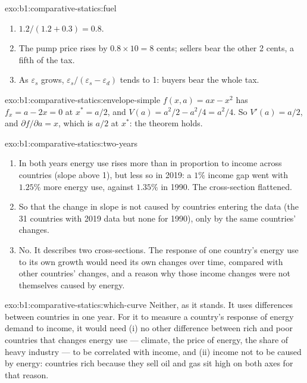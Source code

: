 \begin{solution}{exo:b1:comparative-statics:fuel}
\begin{enumerate}
  \item $1.2/(1.2 + 0.3) = 0.8$.
  \item The pump price rises by $0.8 \times 10 = 8$ cents; sellers bear the
    other 2 cents, a fifth of the tax.
  \item As $\varepsilon_s$ grows, $\varepsilon_s/(\varepsilon_s - \varepsilon_d)$ tends
    to 1: buyers bear the whole tax.
\end{enumerate}
\end{solution}

\begin{solution}{exo:b1:comparative-statics:envelope-simple}
$f(x, a) = ax - x^2$ has $f_x = a - 2x = 0$ at $x^* = a/2$, and
$V(a) = a^2/2 - a^2/4 = a^2/4$. So $V'(a) = a/2$, and
$\partial f/\partial a = x$, which is $a/2$ at $x^*$: the theorem holds.
\end{solution}

\begin{solution}{exo:b1:comparative-statics:two-years}
\begin{enumerate}
  \item In both years energy use rises more than in proportion to income
    across countries (slope above 1), but less so in 2019: a $1\%$ income gap
    went with $1.25\%$ more energy use, against $1.35\%$ in 1990. The
    cross-section flattened.
  \item So that the change in slope is not caused by countries entering the
    data (the 31 countries with 2019 data but none for 1990), only by the
    same countries' changes.
  \item No. It describes two cross-sections. The response of one country's
    energy use to its own growth would need its own changes over time,
    compared with other countries' changes, and a reason why those income
    changes were not themselves caused by energy.
\end{enumerate}
\end{solution}

\begin{solution}{exo:b1:comparative-statics:which-curve}
Neither, as it stands. It uses differences between countries in one year.
For it to measure a country's response of energy demand to income, it would
need (i) no other difference between rich and poor countries that changes
energy use --- climate, the price of energy, the share of heavy industry ---
to be correlated with income, and (ii) income not to be caused by energy:
countries rich because they sell oil and gas sit high on both axes for that
reason.
\end{solution}

